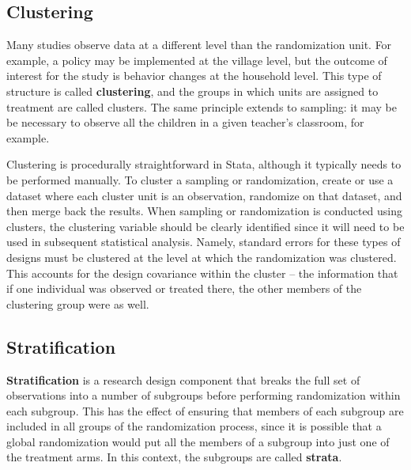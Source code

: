 \subsection{Clustering}

Many studies observe data at a different level than the randomization unit.
For example, a policy may be implemented at the village level,
but the outcome of interest for the study is behavior changes at the household level.
This type of structure is called \textbf{clustering},
and the groups in which units are assigned to treatment are called clusters.
The same principle extends to sampling:
it may be be necessary to observe all the children
in a given teacher's classroom, for example.

Clustering is procedurally straightforward in Stata,
although it typically needs to be performed manually.
To cluster a sampling or randomization,
create or use a dataset where each cluster unit is an observation,
randomize on that dataset, and then merge back the results.
When sampling or randomization is conducted using clusters,
the clustering variable should be clearly identified
since it will need to be used in subsequent statistical analysis.
Namely, standard errors for these types of designs must be clustered
at the level at which the randomization was clustered.
This accounts for the design covariance within the cluster --
the information that if one individual was observed or treated there,
the other members of the clustering group were as well.

\subsection{Stratification}

\textbf{Stratification} is a research design component
that breaks the full set of observations into a number of subgroups
before performing randomization within each subgroup.
This has the effect of ensuring that members of each subgroup
are included in all groups of the randomization process,
since it is possible that a global randomization
would put all the members of a subgroup into just one of the treatment arms.
In this context, the subgroups are called \textbf{strata}.

